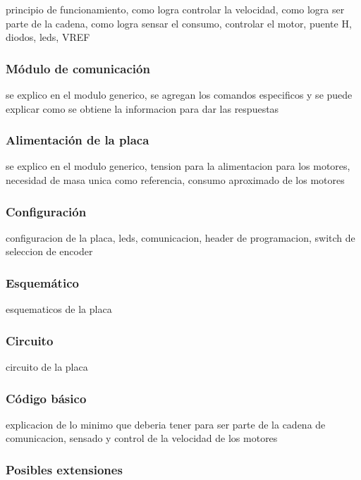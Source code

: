 principio de funcionamiento, como logra controlar la velocidad, como logra ser parte de la cadena, como logra sensar el consumo, controlar el motor, puente H, diodos, leds, VREF

\subsubsection{M\'odulo de comunicaci\'on}
\label{}

se explico en el modulo generico, se agregan los comandos especificos y se puede explicar como se obtiene la informacion para dar las respuestas

\subsubsection{Alimentaci\'on de la placa}
\label{}

se explico en el modulo generico, tension para la alimentacion para los motores, necesidad de masa unica como referencia, consumo aproximado de los motores

\subsubsection{Configuraci\'on}
\label{}

configuracion de la placa, leds, comunicacion, header de programacion, switch de seleccion de encoder

\subsubsection{Esquem\'atico}
\label{}

esquematicos de la placa

\subsubsection{Circuito}
\label{}

circuito de la placa

\subsubsection{C\'odigo b\'asico}
\label{}

explicacion de lo minimo que deberia tener para ser parte de la cadena de comunicacion, sensado y control de la velocidad de los motores

\subsubsection{Posibles extensiones}
\label{}

